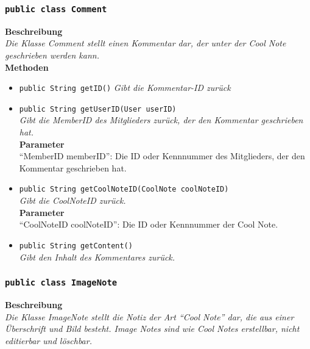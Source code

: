 \subsubsection{\texttt{public class Comment}}

	\textbf{Beschreibung} \\
	\textit{Die Klasse Comment stellt einen Kommentar dar, der unter der Cool Note geschrieben werden kann.} \\
	
	\textbf{Methoden}
	\begin{itemize}
		\item\texttt{public String getID()}
		\textit{Gibt die Kommentar-ID zurück}
		
		\item\texttt{{public String getUserID(User userID)}}\\
		\textit{Gibt die MemberID des Mitglieders zurück, der den Kommentar geschrieben hat.}\\
		\textbf{Parameter}\\
		“MemberID memberID”: Die ID oder Kennnummer des Mitglieders, der den Kommentar geschrieben hat.\\
		
		\item\texttt{{public String getCoolNoteID(CoolNote coolNoteID)}}\\
		\textit{Gibt die CoolNoteID zurück.}\\
		\textbf{Parameter}\\
		“CoolNoteID coolNoteID”: Die ID oder Kennnummer der Cool Note.\\
		
		\item\texttt{{public String getContent()}}\\
		\textit{Gibt den Inhalt des Kommentares zurück.}\\
	\end{itemize}

\subsubsection{\texttt{public class ImageNote}}

	\textbf{Beschreibung} \\
	\textit{Die Klasse ImageNote stellt die Notiz der Art “Cool Note” dar, die aus einer Überschrift und Bild besteht. Image Notes sind wie Cool Notes erstellbar, nicht editierbar und löschbar.} \\
	
